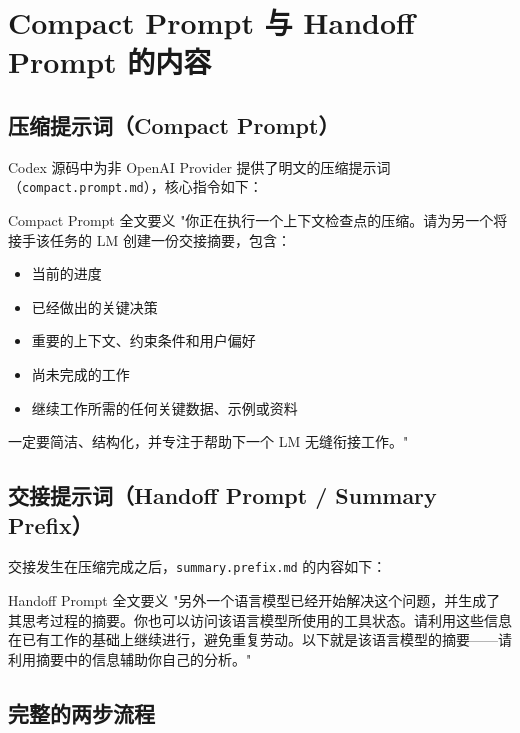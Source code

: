 \section{Compact Prompt 与 Handoff Prompt 的内容}

\subsection{压缩提示词（Compact Prompt）}

Codex 源码中为非 OpenAI Provider 提供了明文的压缩提示词（\texttt{compact.prompt.md}），核心指令如下：

\begin{importantbox}{Compact Prompt 全文要义}
"你正在执行一个上下文检查点的压缩。请为另一个将接手该任务的 LM 创建一份交接摘要，包含：
\begin{itemize}
    \item 当前的进度
    \item 已经做出的关键决策
    \item 重要的上下文、约束条件和用户偏好
    \item 尚未完成的工作
    \item 继续工作所需的任何关键数据、示例或资料
\end{itemize}
一定要简洁、结构化，并专注于帮助下一个 LM 无缝衔接工作。"
\end{importantbox}

\subsection{交接提示词（Handoff Prompt / Summary Prefix）}

交接发生在压缩完成之后，\texttt{summary.prefix.md} 的内容如下：

\begin{importantbox}{Handoff Prompt 全文要义}
"另外一个语言模型已经开始解决这个问题，并生成了其思考过程的摘要。你也可以访问该语言模型所使用的工具状态。请利用这些信息在已有工作的基础上继续进行，避免重复劳动。以下就是该语言模型的摘要——请利用摘要中的信息辅助你自己的分析。"
\end{importantbox}

\subsection{完整的两步流程}

